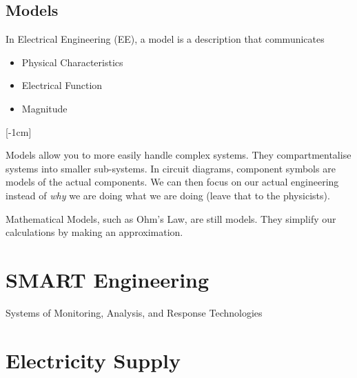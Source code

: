 \documentclass[12pt]{article}
\begin{document}
\subsection{Models}
In Electrical Engineering (EE), a model is a description that communicates

\begin{itemize}
  \item Physical Characteristics 
  \item Electrical Function
  \item Magnitude
\end{itemize}

[-1cm]

\vspace{3pt}
Models allow you to more easily handle complex systems.
They compartmentalise systems into smaller sub-systems.
In circuit diagrams, component symbols are models of the actual components.
We can then focus on our actual engineering instead of {\it why} we are doing what we are doing (leave that to the physicists).

Mathematical Models, such as Ohm's Law, are still models. 
They simplify our calculations by making an approximation.

\section{SMART Engineering}
\begin{definition*}
  Systems of Monitoring, Analysis, and Response Technologies
\end{definition*}

\section{Electricity Supply}
\end{document}
